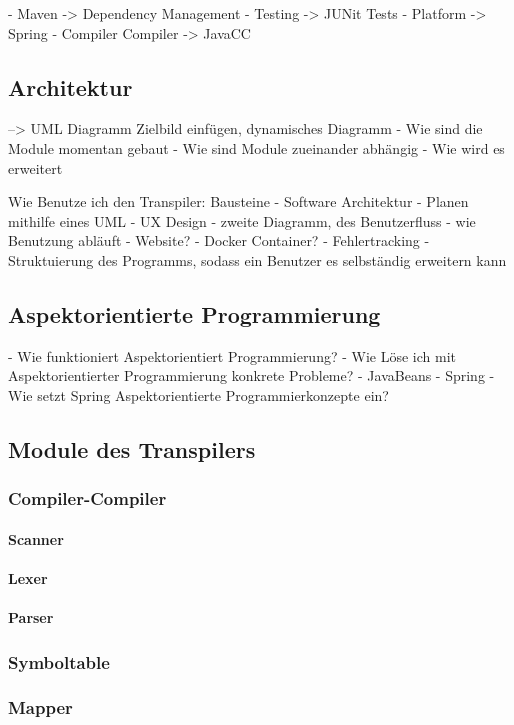 - Maven -> Dependency Management
- Testing -> JUNit Tests
- Platform -> Spring
- Compiler Compiler -> JavaCC

\subsection{Architektur} 
--> UML Diagramm Zielbild einfügen, dynamisches Diagramm
- Wie sind die Module momentan gebaut
- Wie sind Module zueinander abhängig
- Wie wird es erweitert

Wie Benutze ich den Transpiler:
Bausteine
- Software Architektur
	- Planen mithilfe eines UML
	- UX Design 
        - zweite Diagramm, des Benutzerfluss
        - wie Benutzung abläuft
		- Website?
		- Docker Container?
- Fehlertracking
- Struktuierung des Programms, sodass ein Benutzer es selbständig erweitern kann

\subsection{Aspektorientierte Programmierung}
- Wie funktioniert Aspektorientiert Programmierung?
	- Wie Löse ich mit Aspektorientierter Programmierung konkrete Probleme?
- JavaBeans
- Spring
	- Wie setzt Spring Aspektorientierte Programmierkonzepte ein?
 
\subsection{Module des Transpilers}
\subsubsection{Compiler-Compiler}
\paragraph{Scanner}
\paragraph{Lexer}
\paragraph{Parser}
\subsubsection{Symboltable}

\subsubsection{Mapper}


